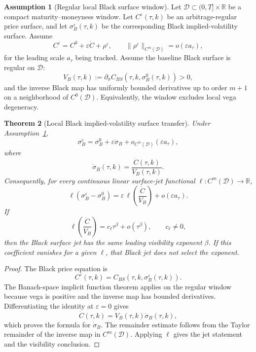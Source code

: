 \documentclass[11pt,a4paper]{amsart}
\theoremstyle{plain}
\newtheorem{theorem}{Theorem}[section]
\theoremstyle{definition}
\newtheorem{assumption}[theorem]{Assumption}
\theoremstyle{remark}
\newcommand{\R}{\mathbb{R}}
\newcommand{\cD}{\mathcal{D}}
\begin{document}
\begin{assumption}[Regular local Black surface window]\label{ass:black-window}
Let \(\cD\subset(0,T]\times\R\) be a compact maturity--moneyness window.  Let
\(C^\varepsilon(\tau,k)\) be an arbitrage-regular price surface, and let
\(\sigma_B^\varepsilon(\tau,k)\) be the corresponding Black implied-volatility surface.  Assume
\[
        C^\varepsilon=C^0+\varepsilon\dot C+\rho^\varepsilon,
        \qquad
        \|\rho^\varepsilon\|_{C^m(\cD)}=o(\varepsilon a_\tau),
\]
for the leading scale \(a_\tau\) being tracked.  Assume the baseline Black surface is regular on
\(\cD\):
\[
        V_B(\tau,k)
        :=
        \partial_\sigma C_{BS}(\tau,k,\sigma_B^0(\tau,k))
        >0,
\]
and the inverse Black map has uniformly bounded derivatives up to order \(m+1\) on a neighborhood
of \(C^0(\cD)\).  Equivalently, the window excludes local vega degeneracy.
\end{assumption}

\begin{theorem}[Local Black implied-volatility surface transfer]\label{thm:black-surface-transfer}
Under Assumption~\ref{ass:black-window},
\[
        \sigma_B^\varepsilon
        =
        \sigma_B^0+
        \varepsilon\dot\sigma_B+o_{C^m(\cD)}(\varepsilon a_\tau),
\]
where
\[
        \dot\sigma_B(\tau,k)
        =
        \frac{\dot C(\tau,k)}{V_B(\tau,k)}.
\]
Consequently, for every continuous linear surface-jet functional \(\ell:C^m(\cD)\to\R\),
\[
        \ell(\sigma_B^\varepsilon-\sigma_B^0)
        =
        \varepsilon\,\ell\!\left(\frac{\dot C}{V_B}\right)
        +
        o(\varepsilon a_\tau).
\]
If
\[
        \ell\!\left(\frac{\dot C}{V_B}\right)
        =
        c_\ell\tau^\beta+o(\tau^\beta),
        \qquad
        c_\ell\ne0,
\]
then the Black surface jet has the same leading visibility exponent \(\beta\).  If this coefficient
vanishes for a given \(\ell\), that Black jet does not select the exponent.
\end{theorem}

\begin{proof}
The Black price equation is
\[
        C^\varepsilon(\tau,k)=C_{BS}(\tau,k,\sigma_B^\varepsilon(\tau,k)).
\]
The Banach-space implicit function theorem applies on the regular window because vega is positive
and the inverse map has bounded derivatives.  Differentiating the identity at
\(\varepsilon=0\) gives
\[
        \dot C(\tau,k)=V_B(\tau,k)\dot\sigma_B(\tau,k),
\]
which proves the formula for \(\dot\sigma_B\).  The remainder estimate follows from the Taylor
remainder of the inverse map in \(C^m(\cD)\).  Applying \(\ell\) gives the jet statement and the
visibility conclusion.
\end{proof}
\end{document}

